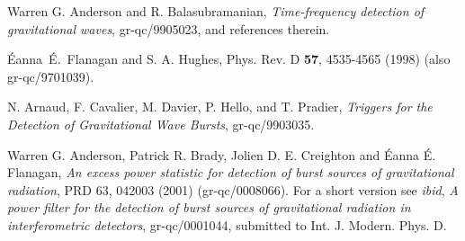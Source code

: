 \newpage
\begin{thebibliography}{0}
Warren G. Anderson and R. Balasubramanian, \textit{Time-frequency
detection of gravitational waves}, gr-qc/9905023, and references
therein. 

\'Eanna~\'E.~Flanagan and S. A. Hughes, Phys. Rev. D {\bf 57},
4535-4565 (1998) (also gr-qc/9701039).  

N. Arnaud, F. Cavalier, M. Davier, P. Hello, and T. Pradier,
\textit{Triggers for the Detection of Gravitational Wave Bursts},
gr-qc/9903035.  

Warren G. Anderson, Patrick R. Brady, Jolien D. E. Creighton and 
{\'E}anna {\'E}. Flanagan, 
\textit{An excess power statistic for detection of burst sources of
gravitational radiation}, PRD 63, 042003 (2001) (gr-qc/0008066).
For a short version see {\it ibid}, \textit{A power filter for the
detection of burst sources of gravitational radiation in
interferometric detectors}, gr-qc/0001044, submitted to
Int. J. Modern. Phys. D.

\end{thebibliography}




